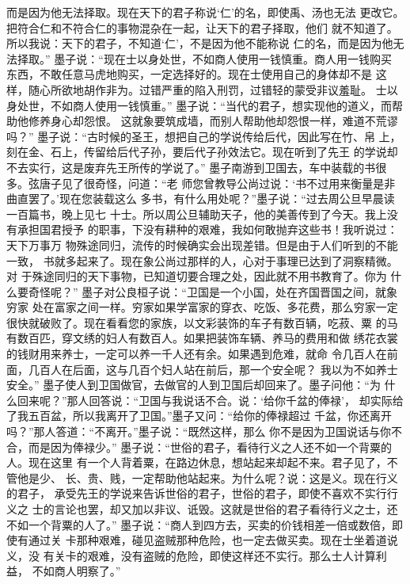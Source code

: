 \documentclass[12pt,UTF8]{ctexbook}
\begin{document}
而是因为他无法择取。现在天下的君子称说‘仁’的名，即使禹、汤也无法 
更改它。把符合仁和不符合仁的事物混杂在一起，让天下的君子择取，他们 
就不知道了。所以我说：天下的君子，不知道‘仁’，不是因为他不能称说 
仁的名，而是因为他无法择取。” 
墨子说：“现在士以身处世，不如商人使用一钱慎重。商人用一钱购买 
东西，不敢任意马虎地购买，一定选择好的。现在士使用自己的身体却不是 
这样，随心所欲地胡作非为。过错严重的陷入刑罚，过错轻的蒙受非议羞耻。 
士以身处世，不如商人使用一钱慎重。” 
墨子说：“当代的君子，想实现他的道义，而帮助他修养身心却怨恨。 
这就象要筑成墙，而别人帮助他却怨恨一样，难道不荒谬吗？” 
墨子说：“古时候的圣王，想把自己的学说传给后代，因此写在竹、帛 
上，刻在金、石上，传留给后代子孙，要后代子孙效法它。现在听到了先王 
的学说却不去实行，这是废弃先王所传的学说了。” 
墨子南游到卫国去，车中装载的书很多。弦唐子见了很奇怪，问道：“老 
师您曾教导公尚过说：‘书不过用来衡量是非曲直罢了。’现在您装载这么 
多书，有什么用处呢？”墨子说：“过去周公旦早晨读一百篇书，晚上见七 
十士。所以周公旦辅助天子，他的美善传到了今天。我上没有承担国君授予 
的职事，下没有耕种的艰难，我如何敢抛弃这些书！我听说过：天下万事万 
物殊途同归，流传的时候确实会出现差错。但是由于人们听到的不能一致， 
书就多起来了。现在象公尚过那样的人，心对于事理已达到了洞察精微。对 
于殊途同归的天下事物，已知道切要合理之处，因此就不用书教育了。你为 
什么要奇怪呢？” 
墨子对公良桓子说：“卫国是一个小国，处在齐国晋国之间，就象穷家 
处在富家之间一样。穷家如果学富家的穿衣、吃饭、多花费，那么穷家一定 
很快就破败了。现在看看您的家族，以文彩装饰的车子有数百辆，吃菽、粟 
的马有数百匹，穿文绣的妇人有数百人。如果把装饰车辆、养马的费用和做 
绣花衣裳的钱财用来养士，一定可以养一千人还有余。如果遇到危难，就命 
令几百人在前面，几百人在后面，这与几百个妇人站在前后，那一个安全呢？ 
我以为不如养士安全。” 
墨子使人到卫国做官，去做官的人到卫国后却回来了。墨子问他：“为 
什么回来呢？”那人回答说：“卫国与我说话不合。说：‘给你千盆的俸禄’， 
却实际给了我五百盆，所以我离开了卫国。”墨子又问：“给你的俸禄超过 
千盆，你还离开吗？”那人答道：“不离开。”墨子说：“既然这样，那么 
你不是因为卫国说话与你不合，而是因为俸禄少。” 
墨子说：“世俗的君子，看待行义之人还不如一个背粟的人。现在这里 
有一个人背着粟，在路边休息，想站起来却起不来。君子见了，不管他是少、 
长、贵、贱，一定帮助他站起来。为什么呢？说：这是义。现在行义的君子， 
承受先王的学说来告诉世俗的君子，世俗的君子，即使不喜欢不实行行义之 
士的言论也罢，却又加以非议、诋毁。这就是世俗的君子看待行义之士，还 
不如一个背粟的人了。” 
墨子说：“商人到四方去，买卖的价钱相差一倍或数倍，即使有通过关 
卡那种艰难，碰见盗贼那种危险，也一定去做买卖。现在士坐着道说义，没 
有关卡的艰难，没有盗贼的危险，即使这样还不实行。那么士人计算利益， 
不如商人明察了。” 
\end{document}
